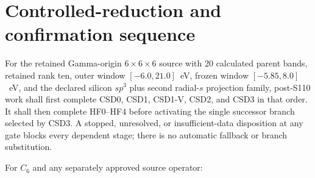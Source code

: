 \documentclass[11pt]{report}
\begin{document}
\chapter{Controlled-reduction and confirmation sequence}

For the retained Gamma-origin $6\times6\times6$ source with 20 calculated parent
bands, retained rank ten, outer window $[-6.0,21.0]$~eV, frozen window
$[-5.85,8.0]$~eV, and the declared silicon $sp^3$ plus second radial-$s$ projection
family, post-S110 work shall first complete CSD0, CSD1, CSD1-V, CSD2, and CSD3 in that
order.  It shall then complete
HF0--HF4 before activating the single successor branch selected by CSD3.  A stopped,
unresolved, or insufficient-data disposition at any gate blocks every dependent stage;
there is no automatic fallback or branch substitution.

For $C_6$ and any separately approved source operator:
\end{document}
